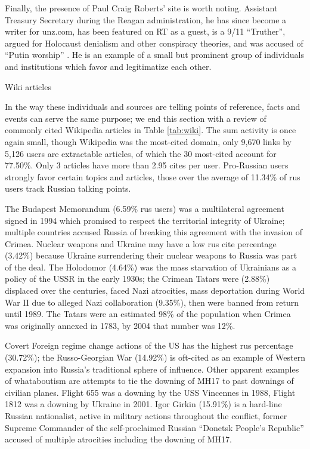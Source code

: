 Finally, the presence of Paul Craig Roberts' site is worth noting.
Assistant Treasury Secretary during the Reagan administration, he has since become a writer for unz.com, has been featured on RT as a guest, is a 9/11 ``Truther'', argued for Holocaust denialism and other conspiracy theories, and was accused of ``Putin worship'' \cite[p. 2388]{marmura2014}.
He is an example of a small but prominent group of individuals and institutions which favor and legitimatize each other.

\begin{table}[!ht]
\small
\centering
\caption{Wiki articles}

\label{tab:wiki}
\end{table}

In the way these individuals and sources are telling points of reference, facts and events can serve the same purpose; we end this section with a review of commonly cited Wikipedia articles in Table \ref{tab:wiki}.
The sum activity is once again small, though Wikipedia was the most-cited domain, only 9,670 links by 5,126 users are extractable articles, of which the 30 most-cited account for 77.50\%.
Only 3 articles have more than 2.95 cites per user.
Pro-Russian users strongly favor certain topics and articles, those over the average of 11.34\% of rus users track Russian talking points.

The Budapest Memorandum (6.59\% rus users) was a multilateral agreement signed in 1994 which promised to respect the territorial integrity of Ukraine; multiple countries accused Russia of breaking this agreement with the invasion of Crimea.
Nuclear weapons and Ukraine may have a low rus cite percentage (3.42\%) because Ukraine surrendering their nuclear weapons to Russia was part of the deal.
The Holodomor (4.64\%) was the mass starvation of Ukrainians as a policy of the USSR in the early 1930s; the Crimean Tatars were (2.88\%) displaced over the centuries, faced Nazi atrocities, mass deportation during World War II due to alleged Nazi collaboration (9.35\%), then were banned from return until 1989.
The Tatars were an estimated 98\% of the population when Crimea was originally annexed in 1783, by 2004 that number was 12\%.

Covert Foreign regime change actions of the US has the highest rus percentage (30.72\%); the Russo-Georgian War (14.92\%) is oft-cited as an example of Western expansion into Russia's traditional sphere of influence.
Other apparent examples of whataboutism are attempts to tie the downing of MH17 to past downings of civilian planes.
Flight 655 was a downing by the USS Vincennes in 1988, Flight 1812 was a downing by Ukraine in 2001.
Igor Girkin (15.91\%) is a hard-line Russian nationalist, active in military actions throughout the conflict, former Supreme Commander of the self-proclaimed Russian ``Donetsk People's Republic'' accused of multiple atrocities including the downing of MH17.

